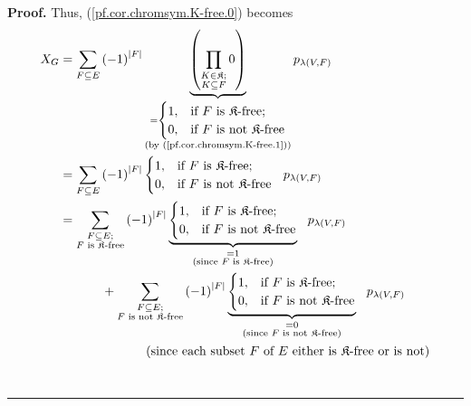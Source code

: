 \documentclass[numbers=enddot,12pt,final,onecolumn,notitlepage]{scrartcl}%
\theoremstyle{definition}
\newenvironment{proof}[1][Proof]{\noindent\textbf{#1.} }{\ \rule{0.5em}{0.5em}}
\newenvironment{verlong}{}{}
\let\sumnonlimits\sum
\let\prodnonlimits\prod
\renewcommand{\sum}{\sumnonlimits\limits}
\renewcommand{\prod}{\prodnonlimits\limits}
\begin{document}
\begin{verlong}
\begin{proof}
Thus, (\ref{pf.cor.chromsym.K-free.0}) becomes%
\begin{align*}
X_{G}  &  =\sum_{F\subseteq E}\left(  -1\right)  ^{\left\vert F\right\vert
}\underbrace{\left(  \prod_{\substack{K\in\mathfrak{K};\\K\subseteq
F}}0\right)  }_{\substack{=%
\begin{cases}
1, & \text{if }F\text{ is }\mathfrak{K}\text{-free;}\\
0, & \text{if }F\text{ is not }\mathfrak{K}\text{-free}%
\end{cases}
\\\text{(by (\ref{pf.cor.chromsym.K-free.1}))}}}p_{\lambda\left(  V,F\right)
}\\
&  =\sum_{F\subseteq E}\left(  -1\right)  ^{\left\vert F\right\vert }%
\begin{cases}
1, & \text{if }F\text{ is }\mathfrak{K}\text{-free;}\\
0, & \text{if }F\text{ is not }\mathfrak{K}\text{-free}%
\end{cases}
\ \ p_{\lambda\left(  V,F\right)  }\\
&  =\sum_{\substack{F\subseteq E;\\F\text{ is }\mathfrak{K}\text{-free}%
}}\left(  -1\right)  ^{\left\vert F\right\vert }\underbrace{%
\begin{cases}
1, & \text{if }F\text{ is }\mathfrak{K}\text{-free;}\\
0, & \text{if }F\text{ is not }\mathfrak{K}\text{-free}%
\end{cases}
}_{\substack{=1\\\text{(since }F\text{ is }\mathfrak{K}\text{-free)}%
}}\ \ p_{\lambda\left(  V,F\right)  }\\
&  \ \ \ \ \ \ \ \ \ \ +\sum_{\substack{F\subseteq E;\\F\text{ is not
}\mathfrak{K}\text{-free}}}\left(  -1\right)  ^{\left\vert F\right\vert
}\underbrace{%
\begin{cases}
1, & \text{if }F\text{ is }\mathfrak{K}\text{-free;}\\
0, & \text{if }F\text{ is not }\mathfrak{K}\text{-free}%
\end{cases}
}_{\substack{=0\\\text{(since }F\text{ is not }\mathfrak{K}\text{-free)}%
}}\ \ p_{\lambda\left(  V,F\right)  }\\
&  \ \ \ \ \ \ \ \ \ \ \ \ \ \ \ \ \ \ \ \ \left(  \text{since each subset
}F\text{ of }E\text{ either is }\mathfrak{K}\text{-free or is not}\right) \\

\end{align*}
\end{proof}
\end{verlong}
\end{document}
